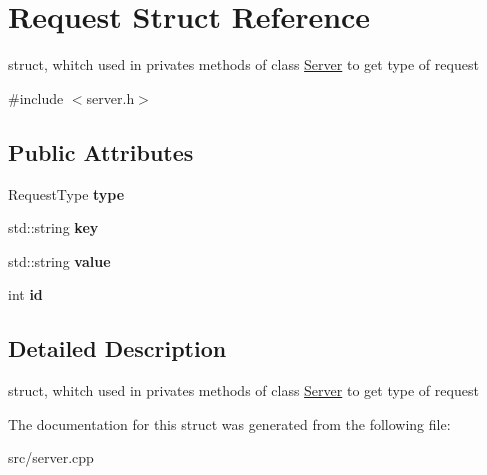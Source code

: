 \hypertarget{structRequest}{}\section{Request Struct Reference}
\label{structRequest}


struct, whitch used in privates methods of class \hyperlink{classServer}{Server} to get type of request  




{\ttfamily \#include $<$server.\+h$>$}

\subsection*{Public Attributes}
\begin{DoxyCompactItemize}
\item 
\mbox{\label{structRequest_affc001ac329251d9015065c5643cae67}} 
Request\+Type {\bfseries type}
\item 
\mbox{\label{structRequest_ae844057c9d9aa9fc3a7e762a3a7e1960}} 
std\+::string {\bfseries key}
\item 
\mbox{\label{structRequest_a1a1a4e754b5081515d668e2ab8060d4a}} 
std\+::string {\bfseries value}
\item 
\mbox{\label{structRequest_a026538b5d27774177b27d0552d25fa13}} 
int {\bfseries id}
\end{DoxyCompactItemize}


\subsection{Detailed Description}
struct, whitch used in privates methods of class \hyperlink{classServer}{Server} to get type of request 

The documentation for this struct was generated from the following file\+:\begin{DoxyCompactItemize}
\item 
src/server.\+cpp\end{DoxyCompactItemize}
